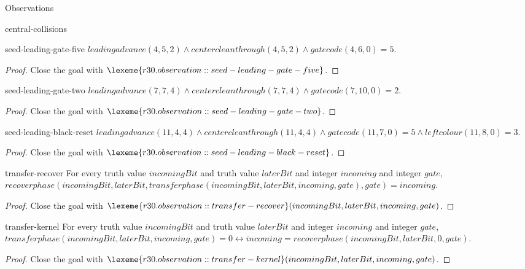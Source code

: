 \begin{lexlean}{Observations}
\begin{section}{central-collisions}
\begin{theorem}{seed-leading-gate-five}
\(leadingadvance(4, 5, 2) ∧ centercleanthrough(4, 5, 2) ∧ gatecode(4, 6, 0) = 5\).
\begin{proof}
Close the goal with \(\lexeme{r30.observation::seed-leading-gate-five}\).
\end{proof}
\end{theorem}

\begin{theorem}{seed-leading-gate-two}
\(leadingadvance(7, 7, 4) ∧ centercleanthrough(7, 7, 4) ∧ gatecode(7, 10, 0) = 2\).
\begin{proof}
Close the goal with \(\lexeme{r30.observation::seed-leading-gate-two}\).
\end{proof}
\end{theorem}

\begin{theorem}{seed-leading-black-reset}
\(leadingadvance(11, 4, 4) ∧ centercleanthrough(11, 4, 4) ∧ gatecode(11, 7, 0) = 5 ∧ leftcolour(11, 8, 0) = 3\).
\begin{proof}
Close the goal with \(\lexeme{r30.observation::seed-leading-black-reset}\).
\end{proof}
\end{theorem}

\begin{theorem}{transfer-recover}
For every truth value \(incomingBit\) and truth value \(laterBit\) and integer \(incoming\) and integer \(gate\), \(recoverphase(incomingBit, laterBit, transferphase(incomingBit, laterBit, incoming, gate), gate) = incoming\).
\begin{proof}
Close the goal with \(\lexeme{r30.observation::transfer-recover}(incomingBit, laterBit, incoming, gate)\).
\end{proof}
\end{theorem}

\begin{theorem}{transfer-kernel}
For every truth value \(incomingBit\) and truth value \(laterBit\) and integer \(incoming\) and integer \(gate\), \(transferphase(incomingBit, laterBit, incoming, gate) = 0 ↔ incoming = recoverphase(incomingBit, laterBit, 0, gate)\).
\begin{proof}
Close the goal with \(\lexeme{r30.observation::transfer-kernel}(incomingBit, laterBit, incoming, gate)\).
\end{proof}
\end{theorem}


\end{section}
\end{lexlean}
